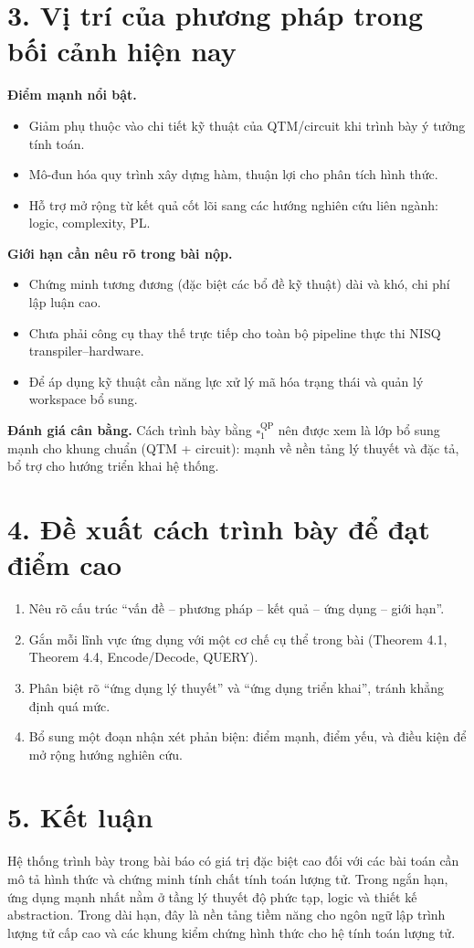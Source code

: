 \documentclass[12pt,a4paper]{article}
\begin{document}
\section*{3. Vị trí của phương pháp trong bối cảnh hiện nay}
\textbf{Điểm mạnh nổi bật.}
\begin{itemize}[leftmargin=1.5em]
\item Giảm phụ thuộc vào chi tiết kỹ thuật của QTM/circuit khi trình bày ý tưởng tính toán.
\item Mô-đun hóa quy trình xây dựng hàm, thuận lợi cho phân tích hình thức.
\item Hỗ trợ mở rộng từ kết quả cốt lõi sang các hướng nghiên cứu liên ngành: logic, complexity, PL.
\end{itemize}

\textbf{Giới hạn cần nêu rõ trong bài nộp.}
\begin{itemize}[leftmargin=1.5em]
\item Chứng minh tương đương (đặc biệt các bổ đề kỹ thuật) dài và khó, chi phí lập luận cao.
\item Chưa phải công cụ thay thế trực tiếp cho toàn bộ pipeline thực thi NISQ transpiler--hardware.
\item Để áp dụng kỹ thuật cần năng lực xử lý mã hóa trạng thái và quản lý workspace bổ sung.
\end{itemize}

\textbf{Đánh giá cân bằng.} Cách trình bày bằng $\square_{1}^{\mathrm{QP}}$ nên được xem là lớp bổ sung mạnh cho khung chuẩn (QTM + circuit): mạnh về nền tảng lý thuyết và đặc tả, bổ trợ cho hướng triển khai hệ thống.

\section*{4. Đề xuất cách trình bày để đạt điểm cao}
\begin{enumerate}[leftmargin=*,itemsep=0.6em]
\item Nêu rõ cấu trúc ``vấn đề -- phương pháp -- kết quả -- ứng dụng -- giới hạn''.
\item Gắn mỗi lĩnh vực ứng dụng với một cơ chế cụ thể trong bài (Theorem 4.1, Theorem 4.4, Encode/Decode, QUERY).
\item Phân biệt rõ ``ứng dụng lý thuyết'' và ``ứng dụng triển khai'', tránh khẳng định quá mức.
\item Bổ sung một đoạn nhận xét phản biện: điểm mạnh, điểm yếu, và điều kiện để mở rộng hướng nghiên cứu.
\end{enumerate}

\section*{5. Kết luận}
Hệ thống trình bày trong bài báo có giá trị đặc biệt cao đối với các bài toán cần mô tả hình thức và chứng minh tính chất tính toán lượng tử. Trong ngắn hạn, ứng dụng mạnh nhất nằm ở tầng lý thuyết độ phức tạp, logic và thiết kế abstraction. Trong dài hạn, đây là nền tảng tiềm năng cho ngôn ngữ lập trình lượng tử cấp cao và các khung kiểm chứng hình thức cho hệ tính toán lượng tử.
\end{document}
